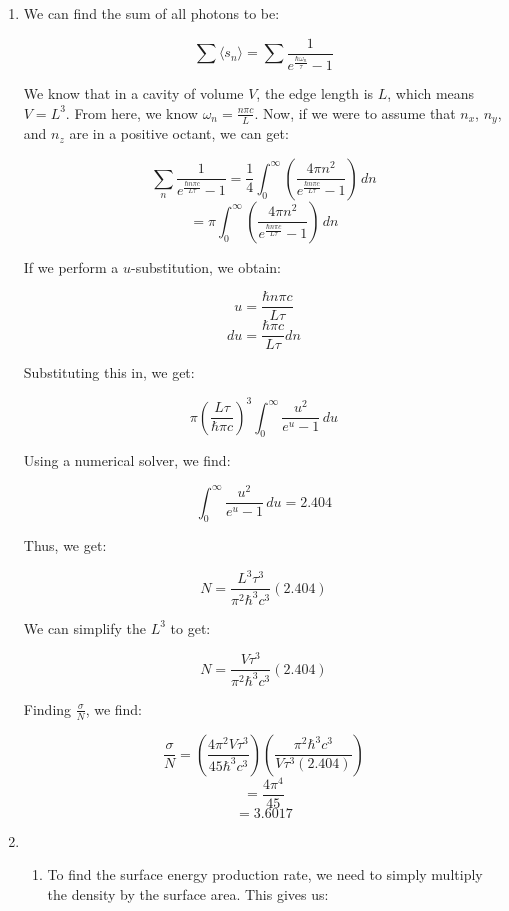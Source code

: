 \begin{enumerate}

  \item

    We can find the sum of all photons to be:

    $$\sum\langle s_n\rangle=\sum\frac{1}{e^{\frac{\hbar\omega_n}{\tau}}-1}$$

    We know that in a cavity of volume $V$, the edge length is $L$, which means $V=L^3$. From here, we know $\omega_n=\frac{n\pi c}{L}$. Now, if we were to assume that $n_x$, $n_y$, and $n_z$ are in a positive octant, we can get:

    $$\sum_n\frac{1}{e^{\frac{\hbar n\pi c}{L\tau}}-1}=\frac{1}{4}\int_0^\infty\left( \frac{4\pi n^2}{e^{\frac{\hbar n\pi c}{L\tau}}-1} \right)\,dn$$
    $$=\pi\int_0^\infty\left( \frac{4\pi n^2}{e^{\frac{\hbar n\pi c}{L\tau}}-1} \right)\,dn$$

    If we perform a $u$-substitution, we obtain:

    $$u=\frac{\hbar n\pi c}{L\tau}$$
    $$du=\frac{\hbar \pi c}{L\tau}dn$$

    Substituting this in, we get:

    $$\pi\left(  \frac{L\tau}{\hbar \pi c}\right)^3\int_0^\infty\frac{u^2}{e^u-1}\,du$$

    Using a numerical solver, we find:

    $$\int_0^\infty\frac{u^2}{e^u-1}\,du=2.404$$

    Thus, we get:

    $$N=\frac{L^3\tau^3}{\pi^2\hbar^3c^3}(2.404)$$

    We can simplify the $L^3$ to get:

    $$\boxed{N=\frac{V\tau^3}{\pi^2\hbar^3c^3}(2.404)}$$

    Finding $\frac{\sigma}{N}$, we find:

    $$\frac{\sigma}{N}=\left( \frac{4\pi^2V\tau^3}{45\hbar^3c^3} \right)\left( \frac{\pi^2\hbar^3c^3}{V\tau^3(2.404)} \right)$$
    $$=\frac{4\pi^4}{45}$$
    $$=3.6017$$

  \item

    \begin{enumerate}

      \item 

        To find the surface energy production rate, we need to simply multiply the density by the surface area. This gives us:


\end{enumerate}
\end{enumerate}
